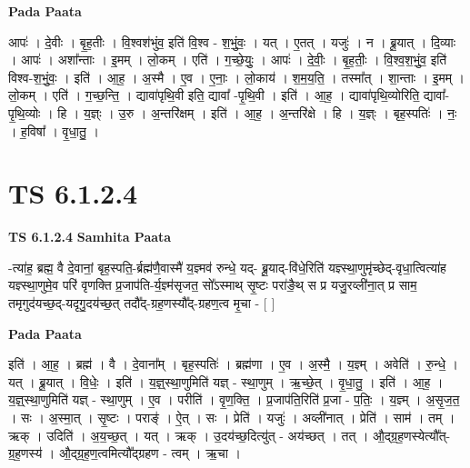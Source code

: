 \documentclass[17pt]{extarticle}
\begin{document}
\textbf{Pada Paata} \newline

आपः॑ । दे॒वीः । बृ॒ह॒तीः । वि॒श्वश॑भुंव॒ इति॑ वि॒श्व - श॒भुं॒वः॒ । यत् । ए॒तत् । यजुः॑ । न । ब्रू॒यात् । दि॒व्याः । आपः॑ । अशा᳚न्ताः । इ॒मम् । लो॒कम् । एति॑ । ग॒च्छे॒युः॒ । आपः॑ । दे॒वीः॒ । बृ॒ह॒तीः॒ । वि॒श्व॒श॒भुं॒व॒ इति॑ विश्व-श॒भुं॒वः॒ । इति॑ । आ॒ह॒ । अ॒स्मै । ए॒व । ए॒नाः॒ । लो॒काय॑ । श॒म॒य॒ति॒ । तस्मा᳚त् । शा॒न्ताः । इ॒मम् । लो॒कम् । एति॑ । ग॒च्छ॒न्ति॒ । द्यावा॑पृथि॒वी इति॒ द्यावा᳚ -पृ॒थि॒वी । इति॑ । आ॒ह॒ । द्यावा॑पृथि॒व्योरिति॒ द्यावा᳚-पृ॒थि॒व्योः । हि । य॒ज्ञ्ः । उ॒रु । अ॒न्तरि॑क्षम् । इति॑ । आ॒ह॒ । अ॒न्तरि॑क्षे । हि । य॒ज्ञ्ः । बृह॒स्पतिः॑ । नः॒ । ह॒विषा᳚ । वृ॒धा॒तु॒ ।  \newline




\section*{ TS 6.1.2.4 }

\textbf{TS 6.1.2.4 } \newline
\textbf{Samhita Paata} \newline

-त्या॑ह॒ ब्रह्म॒ वै दे॒वानां॒ बृह॒स्पति॒-र्ब्रह्म॑णै॒वास्मै॑ य॒ज्ञ्मव॑ रुन्धे॒ यद्- ब्रू॒याद्-वि॑धे॒रिति॑ यज्ञ्स्था॒णुमृ॑च्छेद्-वृधा॒त्वित्या॑ह यज्ञ्स्था॒णुमे॒व परि॑ वृणक्ति प्र॒जाप॑ति-र्य॒ज्ञ्म॑सृजत॒ सो᳚ऽस्माथ् सृ॒ष्टः परा॑ङै॒थ् स प्र यजु॒रव्ली॑ना॒त् प्र साम॒ तमृगुद॑यच्छ॒द्-यदृगु॒दय॑च्छ॒त् तदौ᳚द्-ग्रह॒णस्यौ᳚द्-ग्रहण॒त्व मृ॒चा - [  ] \newline

\textbf{Pada Paata} \newline

इति॑ । आ॒ह॒ । ब्रह्म॑ । वै । दे॒वाना᳚म् । बृह॒स्पतिः॑ । ब्रह्म॑णा । ए॒व । अ॒स्मै॒ । य॒ज्ञ्म् । अवेति॑ । रु॒न्धे॒ । यत् । ब्रू॒यात् । वि॒धेः॒ । इति॑ । य॒ज्ञ्॒स्था॒णुमिति॑ यज्ञ् - स्था॒णुम् । ऋ॒च्छे॒त् । वृ॒धा॒तु॒ । इति॑ । आ॒ह॒ । य॒ज्ञ्॒स्था॒णुमिति॑ यज्ञ् - स्था॒णुम् । ए॒व । परीति॑ । वृ॒ण॒क्ति॒ । प्र॒जाप॑ति॒रिति॑ प्र॒जा - प॒तिः॒ । य॒ज्ञ्म् । अ॒सृ॒ज॒त॒ । सः । अ॒स्मा॒त् । सृ॒ष्टः । पराङ्॑ । ऐ॒त् । सः । प्रेति॑ । यजुः॑ । अव्ली॑नात् । प्रेति॑ । साम॑ । तम् । ऋक् । उदिति॑ । अ॒य॒च्छ॒त् । यत् । ऋक् । उ॒दय॑च्छ॒दित्यु॑त् - अय॑च्छत् । तत् । औ॒द्ग्र॒ह॒णस्येत्यौ᳚त्-ग्र॒ह॒णस्य॑ । औ॒द्ग्र॒ह॒ण॒त्वमित्यौ᳚द्ग्रहण - त्वम् । ऋ॒चा ।  \newline
\end{document}
